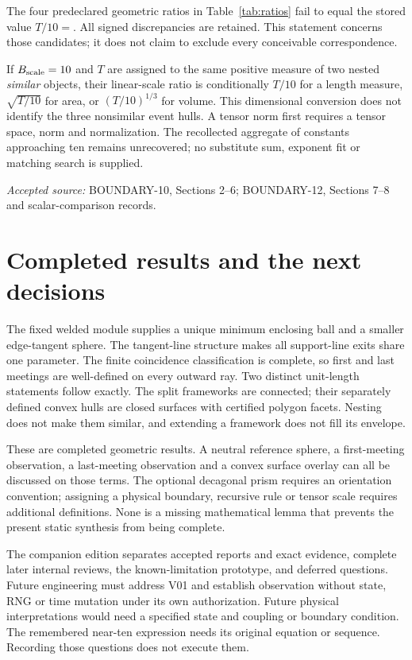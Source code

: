 \documentclass[11pt,a4paper]{article}
\newcommand{\source}[1]{\par{\small\emph{Accepted source:} #1}\par}
\begin{document}
The four predeclared geometric ratios in Table~\ref{tab:ratios} fail to equal the stored value $T/10=$. All signed discrepancies are retained. This statement concerns those candidates; it does not claim to exclude every conceivable correspondence.
\begin{table}[ht]\centering\small
\caption{The four accepted comparisons, transcribed from saved scalar records. Differences are ratio minus $T/10$.}\label{tab:ratios}

\end{table}
If $B_{\rm scale}=10$ and $T$ are assigned to the same positive measure of two nested \emph{similar} objects, their linear-scale ratio is conditionally $T/10$ for a length measure, $\sqrt{T/10}$ for area, or $(T/10)^{1/3}$ for volume. This dimensional conversion does not identify the three nonsimilar event hulls. A tensor norm first requires a tensor space, norm and normalization. The recollected aggregate of constants approaching ten remains unrecovered; no substitute sum, exponent fit or matching search is supplied.
\source{BOUNDARY-10, Sections 2--6; BOUNDARY-12, Sections 7--8 and scalar-comparison records.}

\clearpage\section{Completed results and the next decisions}\label{sec:conclusion}
The fixed welded module supplies a unique minimum enclosing ball and a smaller edge-tangent sphere. The tangent-line structure makes all support-line exits share one parameter. The finite coincidence classification is complete, so first and last meetings are well-defined on every outward ray. Two distinct unit-length statements follow exactly. The split frameworks are connected; their separately defined convex hulls are closed surfaces with certified polygon facets. Nesting does not make them similar, and extending a framework does not fill its envelope.

These are completed geometric results. A neutral reference sphere, a first-meeting observation, a last-meeting observation and a convex surface overlay can all be discussed on those terms. The optional decagonal prism requires an orientation convention; assigning a physical boundary, recursive rule or tensor scale requires additional definitions. None is a missing mathematical lemma that prevents the present static synthesis from being complete.

The companion edition separates accepted reports and exact evidence, complete later internal reviews, the known-limitation prototype, and deferred questions. Future engineering must address V01 and establish observation without state, RNG or time mutation under its own authorization. Future physical interpretations would need a specified state and coupling or boundary condition. The remembered near-ten expression needs its original equation or sequence. Recording those questions does not execute them.
\end{document}
